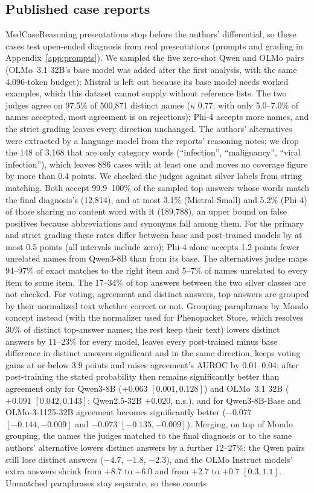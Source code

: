 \documentclass[wcp]{jmlr}
\begin{document}
\subsection{Published case reports}\label{sec:medcase}
MedCaseReasoning presentations stop before the authors' differential, so these cases test open-ended diagnosis from real presentations (prompts and grading in Appendix~\ref{app:prompts}). We sampled the five zero-shot Qwen and OLMo pairs (OLMo~3.1 32B's base model was added after the first analysis, with the same 4,096-token budget); Mistral is left out because its base model needs worked examples, which this dataset cannot supply without reference lists. The two judges agree on 97.5\% of 500,871 distinct names ($\kappa$ 0.77; with only 5.0--7.0\% of names accepted, most agreement is on rejections); Phi-4 accepts more names, and the strict grading leaves every direction unchanged. The authors' alternatives were extracted by a language model from the reports' reasoning notes; we drop the 148 of 3,168 that are only category words (``infection'', ``malignancy'', ``viral infection''), which leaves 886 cases with at least one and moves no coverage figure by more than 0.4 points. We checked the judges against silver labels from string matching. Both accept 99.9--100\% of the sampled top answers whose words match the final diagnosis's (12,814), and at most 3.1\% (Mistral-Small) and 5.2\% (Phi-4) of those sharing no content word with it (189,788), an upper bound on false positives because abbreviations and synonyms fall among them. For the primary and strict grading these rates differ between base and post-trained models by at most 0.5 points (all intervals include zero); Phi-4 alone accepts 1.2 points fewer unrelated names from Qwen3-8B than from its base. The alternatives judge maps 94--97\% of exact matches to the right item and 5--7\% of names unrelated to every item to some item. The 17--34\% of top answers between the two silver classes are not checked. For voting, agreement and distinct answers, top answers are grouped by their normalized text whether correct or not. Grouping paraphrases by Mondo concept instead (with the normalizer used for Phenopacket Store, which resolves 30\% of distinct top-answer names; the rest keep their text) lowers distinct answers by 11--23\% for every model, leaves every post-trained minus base difference in distinct answers significant and in the same direction, keeps voting gains at or below 3.9 points and raises agreement's AUROC by 0.01--0.04; after post-training the stated probability then remains significantly better than agreement only for Qwen3-8B ($+0.063$ $[0.001,0.128]$) and OLMo~3.1 32B ($+0.091$ $[0.042,0.143]$; Qwen2.5-32B $+0.020$, n.s.), and for Qwen3-8B-Base and OLMo-3-1125-32B agreement becomes significantly better ($-0.077$ $[-0.144,-0.009]$ and $-0.073$ $[-0.135,-0.009]$). Merging, on top of Mondo grouping, the names the judges matched to the final diagnosis or to the same authors' alternative lowers distinct answers by a further 12--27\%; the Qwen pairs still lose distinct answers ($-4.7$, $-1.8$, $-2.3$), and the OLMo Instruct models' extra answers shrink from $+8.7$ to $+6.0$ and from $+2.7$ to $+0.7$ $[0.3,1.1]$. Unmatched paraphrases stay separate, so these counts 
\end{document}
